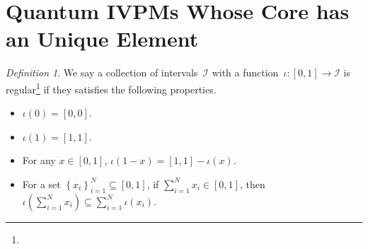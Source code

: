 \documentclass{article}
\theoremstyle{remark}
\newtheorem{definition}{Definition}
\newcommand{\yutsung}[1]{\fbox{\begin{minipage}{0.9\textwidth}\color{purple}{Yu-Tsung says: #1}\end{minipage}}}
\begin{document}
\section{Quantum IVPMs Whose Core has an Unique Element}

\begin{definition}We say a collection of intervals~$\mathscr{I}$
with a function~$\iota:\left[0,1\right]\rightarrow\mathscr{I}$ is
regular\footnote{\yutsung{''regular'' is just a random name pop into my mind...}}
if they satisfies the following properties.
\begin{itemize}
\item $\iota\left(0\right)=\left[0,0\right]$.
\item $\iota\left(1\right)=\left[1,1\right]$. 
\item For any $x\in\left[0,1\right]$, $\iota\left(1-x\right)=\left[1,1\right]-\iota\left(x\right)$.
\item For a set $\left\{ x_{i}\right\} _{i=1}^{N}\subseteq\left[0,1\right]$,
if $\sum_{i=1}^{N}x_{i}\in\left[0,1\right]$, then $\iota\left(\sum_{i=1}^{N}x_{i}\right)\subseteq\sum_{i=1}^{N}\iota\left(x_{i}\right)$.
\end{itemize}
\end{definition}
\end{document}
